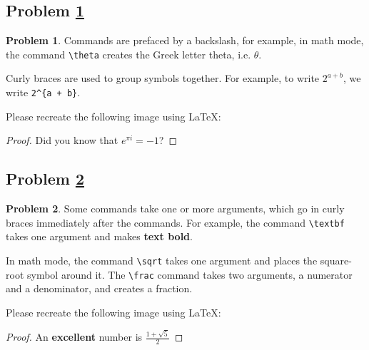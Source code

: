 \documentclass[11pt]{article}
\theoremstyle{definition}
\theoremstyle{definition}
\newtheorem{required}{Problem}
\theoremstyle{definition}
\begin{document}
\newpage
\subsection{Problem \ref{Latex2}} 
\begin{required} \label{Latex2}
Commands are prefaced by a backslash, for example, in math mode, the command \texttt{\textbackslash theta} creates the Greek letter theta, i.e. $\theta$.

Curly braces are used to group symbols together. For example, to write $2^{a + b}$, we write \texttt{2\^{}\{a + b\}}.

Please recreate the following image using \LaTeX:

\end{required}

\begin{proof}
Did you know that $e^{\pi i}=-1$?
\end{proof}



\newpage
\subsection{Problem \ref{Latex3}}
\begin{required} \label{Latex3}
Some commands take one or more arguments, which go in curly braces immediately after the commands. For example, the command \texttt{\textbackslash textbf} takes one argument and makes \textbf{text bold}.

In math mode, the command \texttt{\textbackslash sqrt} takes one argument and places the square-root symbol around it. The \texttt{\textbackslash frac} command takes two arguments, a numerator and a denominator, and creates a fraction.

Please recreate the following image using \LaTeX:

\end{required}

\begin{proof}
An \textbf{excellent} number is $\frac{1+\sqrt{5}}{2}$
\end{proof}



\newpage
\end{document}
